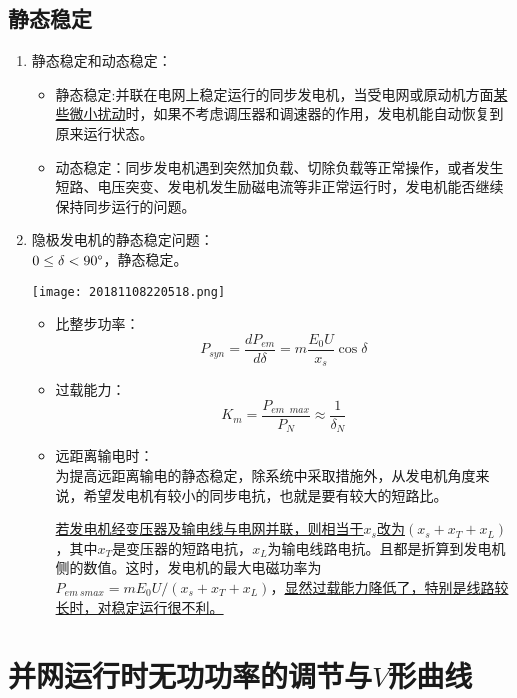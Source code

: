 \documentclass[blue]{elegantnote}
\begin{document}
\subsection{静态稳定}
\begin{enumerate}
	\item 静态稳定和动态稳定：
		\begin{itemize}
			\item 静态稳定:并联在电网上稳定运行的同步发电机，当受电网或原动机方面\underline{某些微小扰动}时，如果不考虑调压器和调速器的作用，发电机能自动恢复到原来运行状态。
			\item 动态稳定：同步发电机遇到突然加负载、切除负载等正常操作，或者发生短路、电压突变、发电机发生励磁电流等非正常运行时，发电机能否继续保持同步运行的问题。
		\end{itemize}
	\item 隐极发电机的静态稳定问题：\\
	$0\leq\delta<90\degree$，静态稳定。
		\begin{center}  
			\texttt{[image: 20181108220518.png]}
		\end{center}  
		\begin{itemize}
			\item 比整步功率：
			$$P_{syn}=\frac{dP_{em}}{d\delta}=m\frac{E_0U}{x_s}\cos\delta$$
			\item 过载能力：
			$$K_m=\frac{P_{em\phantom{a}max}}{P_N}\approx \frac{1}{\delta_N}$$	
			\item 远距离输电时：\\
			为提高远距离输电的静态稳定，除系统中采取措施外，从发电机角度来说，希望发电机有较小的同步电抗，也就是要有较大的短路比。
			\begin{note}
			\underline{若发电机经变压器及输电线与电网并联，则相当于$x_s$改为$(x_s+x_T+x_L)$} ，其中$x_T$是变压器的短路电抗，$x_L$为输电线路电抗。且都是折算到发电机侧的数值。这时，发电机的最大电磁功率为$P_{em\ s max}=mE_0U/(x_s+x_T+x_L)$，\underline{显然过载能力降低了，特别是线路较长时，对稳定运行很不利。}
			\end{note}
		\end{itemize}
\end{enumerate}
\section{并网运行时无功功率的调节与$V$形曲线}
\end{document}
